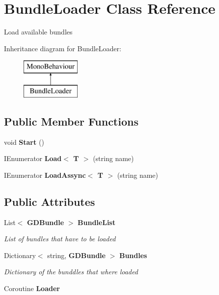 \section{Bundle\+Loader Class Reference}
\label{class_bundle_loader}


Load available bundles  


Inheritance diagram for Bundle\+Loader\+:\begin{figure}[H]
\begin{center}
\leavevmode
\includegraphics[height=2.000000cm]{class_bundle_loader}
\end{center}
\end{figure}
\subsection*{Public Member Functions}
\begin{DoxyCompactItemize}
\item 
void \textbf{ Start} ()
\item 
I\+Enumerator \textbf{ Load$<$ T $>$} (string name)
\item 
I\+Enumerator \textbf{ Load\+Assync$<$ T $>$} (string name)
\end{DoxyCompactItemize}
\subsection*{Public Attributes}
\begin{DoxyCompactItemize}
\item 
List$<$ \textbf{ G\+D\+Bundle} $>$ \textbf{ Bundle\+List}
\begin{DoxyCompactList}\small\item\em List of bundles that have to be loaded \end{DoxyCompactList}\item 
Dictionary$<$ string, \textbf{ G\+D\+Bundle} $>$ \textbf{ Bundles}
\begin{DoxyCompactList}\small\item\em Dictionary of the bunddles that where loaded \end{DoxyCompactList}\item 
Coroutine \textbf{ Loader}
\end{DoxyCompactItemize}


